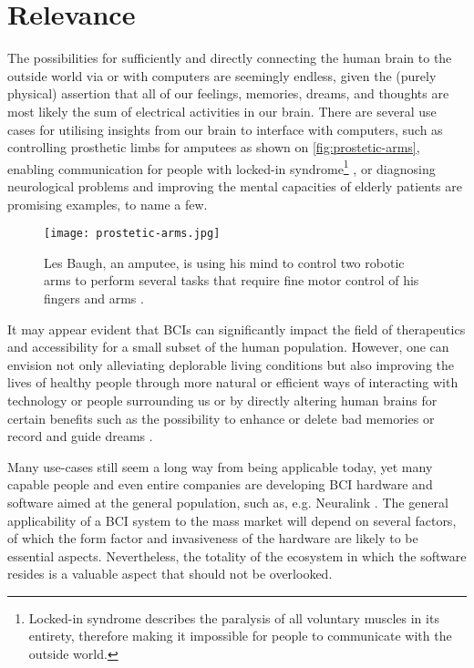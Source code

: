 \section{Relevance}
\label{chapter1-relevance}

The possibilities for sufficiently and directly connecting the human brain to the outside world via or with computers are seemingly endless, given the (purely physical) assertion that all of our feelings, memories, dreams, and thoughts are most likely the sum of electrical activities in our brain. There are several use cases for utilising insights from our brain to interface with computers, such as controlling prosthetic limbs for amputees \citep{campbell_amputee_2014} as shown on \autoref{fig:prostetic-arms}, enabling communication for people with locked-in syndrome\footnote{Locked-in syndrome describes the paralysis of all voluntary muscles in its entirety, therefore making it impossible for people to communicate with the outside world.} \citep{chaudhary_spelling_2022}, or diagnosing neurological problems and improving the mental capacities of elderly patients \citep{belkacem_brain_2020} are promising examples, to name a few.

\begin{figure}[ht]
  \centering
  \texttt{[image: prostetic-arms.jpg]}
  \caption[Les Baugh, an amputee, is using his mind to control two robotic arms to perform several tasks that require fine motor control of his fingers and arms]{Les Baugh, an amputee, is using his mind to control two robotic arms to perform several tasks that require fine motor control of his fingers and arms \citep{campbell_amputee_2014}.}
  \label{fig:prostetic-arms}
\end{figure}

It may appear evident that BCIs can significantly impact the field of therapeutics and accessibility for a small subset of the human population. However, one can envision not only alleviating deplorable living conditions but also improving the lives of healthy people through more natural or efficient ways of interacting with technology or people surrounding us or by directly altering human brains for certain benefits such as the possibility to enhance or delete bad memories \citep{spiers_enhance_2014} or record and guide dreams \citep{haar_horowitz_dormio_2020}.

Many use-cases still seem a long way from being applicable today, yet many capable people and even entire companies are developing BCI hardware and software aimed at the general population, such as, e.g. Neuralink \citep{urban_neuralink_2017}. The general applicability of a BCI system to the mass market will depend on several factors, of which the form factor and invasiveness of the hardware are likely to be essential aspects. Nevertheless, the totality of the ecosystem in which the software resides is a valuable aspect that should not be overlooked.

